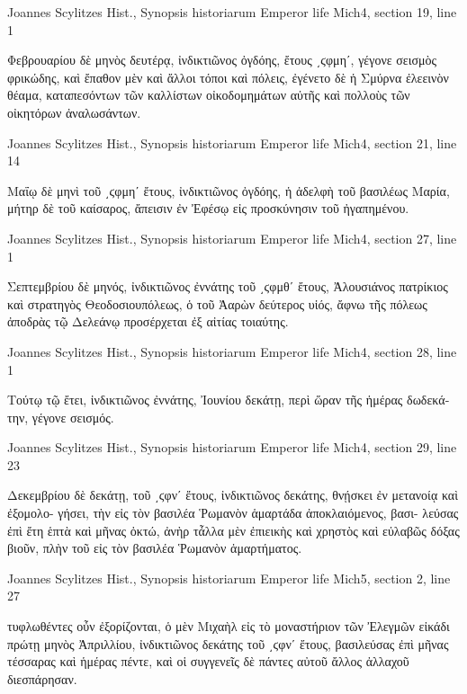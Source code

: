 \documentclass[12pt,letterpaper,twoside,final]{memoir}
\begin{document}
\begin{greek}
Joannes Scylitzes Hist., Synopsis historiarum 
Emperor life Mich4, section 19, line 1

Φεβρουαρίου δὲ μηνὸς δευτέρᾳ, ἰνδικτιῶνος ὀγδόης, ἔτους ͵ϛφμηʹ, 
γέγονε σεισμὸς φρικώδης, καὶ ἔπαθον μὲν καὶ ἄλλοι τόποι καὶ πόλεις, 
ἐγένετο δὲ ἡ Σμύρνα ἐλεεινὸν θέαμα, καταπεσόντων τῶν καλλίστων 
οἰκοδομημάτων αὐτῆς καὶ πολλοὺς τῶν οἰκητόρων ἀναλωσάντων. 



Joannes Scylitzes Hist., Synopsis historiarum 
Emperor life Mich4, section 21, line 14

                                                       Μαΐῳ δὲ μηνὶ τοῦ 
͵ϛφμηʹ ἔτους, ἰνδικτιῶνος ὀγδόης, ἡ ἀδελφὴ τοῦ βασιλέως Μαρία, μήτηρ 
δὲ τοῦ καίσαρος, ἄπεισιν ἐν Ἐφέσῳ εἰς προσκύνησιν τοῦ ἠγαπημένου. 



Joannes Scylitzes Hist., Synopsis historiarum 
Emperor life Mich4, section 27, line 1

Σεπτεμβρίου δὲ μηνός, ἰνδικτιῶνος ἐννάτης τοῦ ͵ϛφμθʹ ἔτους,   
Ἀλουσιάνος πατρίκιος καὶ στρατηγὸς Θεοδοσιουπόλεως, ὁ τοῦ Ἀαρὼν 
δεύτερος υἱός, ἄφνω τῆς πόλεως ἀποδρὰς τῷ Δελεάνῳ προσέρχεται ἐξ 
αἰτίας τοιαύτης. 



Joannes Scylitzes Hist., Synopsis historiarum 
Emperor life Mich4, section 28, line 1

Τούτῳ τῷ ἔτει, ἰνδικτιῶνος ἐννάτης, Ἰουνίου δεκάτῃ, περὶ ὥραν 
τῆς ἡμέρας δωδεκάτην, γέγονε σεισμός. 



Joannes Scylitzes Hist., Synopsis historiarum 
Emperor life Mich4, section 29, line 23

                                                     Δεκεμβρίου δὲ δεκάτῃ, 
τοῦ ͵ϛφνʹ ἔτους, ἰνδικτιῶνος δεκάτης, θνῄσκει ἐν μετανοίᾳ καὶ ἐξομολο-
γήσει, τὴν εἰς τὸν βασιλέα Ῥωμανὸν ἁμαρτάδα ἀποκλαιόμενος, βασι-
λεύσας ἐπὶ ἔτη ἑπτὰ καὶ μῆνας ὀκτώ, ἀνὴρ τἆλλα μὲν ἐπιεικὴς καὶ 
χρηστὸς καὶ εὐλαβῶς δόξας βιοῦν, πλὴν τοῦ εἰς τὸν βασιλέα Ῥωμανὸν 
ἁμαρτήματος. 



Joannes Scylitzes Hist., Synopsis historiarum 
Emperor life Mich5, section 2, line 27

                                               τυφλωθέντες οὖν ἐξορίζονται, ὁ 
μὲν Μιχαὴλ εἰς τὸ μοναστήριον τῶν Ἐλεγμῶν εἰκάδι πρώτῃ μηνὸς 
Ἀπριλλίου, ἰνδικτιῶνος δεκάτης τοῦ ͵ϛφνʹ ἔτους, βασιλεύσας ἐπὶ μῆνας 
τέσσαρας καὶ ἡμέρας πέντε, καὶ οἱ συγγενεῖς δὲ πάντες αὐτοῦ ἄλλος 
ἀλλαχοῦ διεσπάρησαν. 




\end{greek}
\end{document}
